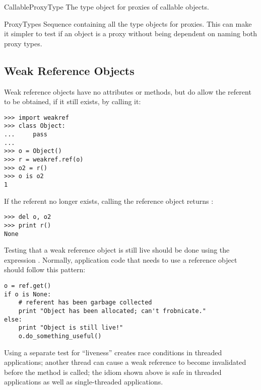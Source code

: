 \begin{datadesc}{CallableProxyType}
  The type object for proxies of callable objects.
\end{datadesc}

\begin{datadesc}{ProxyTypes}
  Sequence containing all the type objects for proxies.  This can make
  it simpler to test if an object is a proxy without being dependent
  on naming both proxy types.
\end{datadesc}


\begin{seealso}
\end{seealso}


\subsection{Weak Reference Objects
            \label{weakref-objects}}

Weak reference objects have no attributes or methods, but do allow the
referent to be obtained, if it still exists, by calling it:

\begin{verbatim}
>>> import weakref
>>> class Object:
...     pass
...
>>> o = Object()
>>> r = weakref.ref(o)
>>> o2 = r()
>>> o is o2
1
\end{verbatim}

If the referent no longer exists, calling the reference object returns
:

\begin{verbatim}
>>> del o, o2
>>> print r()
None
\end{verbatim}

Testing that a weak reference object is still live should be done
using the expression .  Normally,
application code that needs to use a reference object should follow
this pattern:

\begin{verbatim}
o = ref.get()
if o is None:
    # referent has been garbage collected
    print "Object has been allocated; can't frobnicate."
else:
    print "Object is still live!"
    o.do_something_useful()
\end{verbatim}

Using a separate test for ``liveness'' creates race conditions in
threaded applications; another thread can cause a weak reference to
become invalidated before the  method is called; the
idiom shown above is safe in threaded applications as well as
single-threaded applications.


